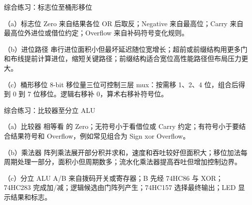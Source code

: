 \begin{chapteranswer}{综合练习：标志位至桶形移位}
\begin{answersubproblem}{（a）标志位}
Zero 来自结果各位 OR 后取反；Negative 来自最高位；Carry 来自最高位外进位或借位约定；Overflow 来自补码符号变化规则。
\end{answersubproblem}
\begin{answersubproblem}{（b）进位路径}
串行进位面积小但最坏延迟随位宽增长；超前或前缀结构用更多门和布线提前计算进位，缩短关键路径；前缀结构适合宽位高性能路径但布局压力更大。
\end{answersubproblem}
\begin{answersubproblem}{（c）桶形移位}
8-bit 移位量三位可控制三层 mux：按需移 1、2、4 位，组合后得到 0 到 7 位移位。逻辑右移补 0，算术右移补符号位。
\end{answersubproblem}
\end{chapteranswer}

\begin{chapteranswer}{综合练习：比较器至分立 ALU}
\begin{answersubproblem}{（a）比较器}
相等看  的 Zero；无符号小于看借位或 Carry 约定；有符号小于要结合结果符号和 Overflow，例如常见组合为 Sign xor Overflow。
\end{answersubproblem}
\begin{answersubproblem}{（b）乘法器}
阵列乘法展开部分积并求和，速度和吞吐较好但面积大；移位加法每周期处理一部分，面积小但周期数多；流水化乘法器提高吞吐但增加控制边界。
\end{answersubproblem}
\begin{answersubproblem}{（c）分立 ALU}
A/B 来自拨码开关或寄存器；B 先经 74HC86 与  XOR；74HC283 完成加/减；逻辑候选由门阵列产生；74HC157 选择最终输出；LED 显示结果和标志。
\end{answersubproblem}
\end{chapteranswer}

